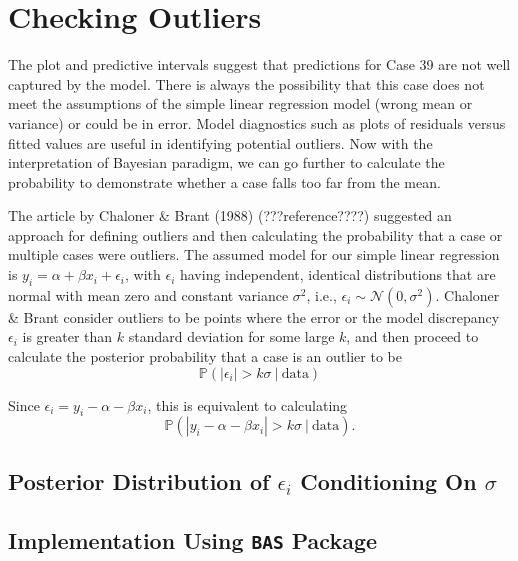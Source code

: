 \documentclass[]{book}
\theoremstyle{definition}
\theoremstyle{definition}
\theoremstyle{definition}
\theoremstyle{remark}
\begin{document}
\section{Checking Outliers}\label{checking-outliers}

The plot and predictive intervals suggest that predictions for Case 39
are not well captured by the model. There is always the possibility that
this case does not meet the assumptions of the simple linear regression
model (wrong mean or variance) or could be in error. Model diagnostics
such as plots of residuals versus fitted values are useful in
identifying potential outliers. Now with the interpretation of Bayesian
paradigm, we can go further to calculate the probability to demonstrate
whether a case falls too far from the mean.

The article by Chaloner \& Brant (1988) (???reference????) suggested an
approach for defining outliers and then calculating the probability that
a case or multiple cases were outliers. The assumed model for our simple
linear regression is \(y_i=\alpha + \beta x_i+\epsilon_i\), with
\(\epsilon_i\) having independent, identical distributions that are
normal with mean zero and constant variance \(\sigma^2\), i.e.,
\(\epsilon_i \sim \mathcal{N}(0, \sigma^2)\). Chaloner \& Brant consider
outliers to be points where the error or the model discrepancy
\(\epsilon_i\) is greater than \(k\) standard deviation for some large
\(k\), and then proceed to calculate the posterior probability that a
case is an outlier to be
\[ \mathbb{P}(|\epsilon_i| > k\sigma ~|~\text{data}) \]

Since \(\epsilon_i = y_i - \alpha-\beta x_i\), this is equivalent to
calculating
\[ \mathbb{P}(|y_i-\alpha-\beta x_i| > k\sigma~|~\text{data}).\]

\subsection{\texorpdfstring{Posterior Distribution of \(\epsilon_i\)
Conditioning On
\(\sigma\)}{Posterior Distribution of \textbackslash{}epsilon\_i Conditioning On \textbackslash{}sigma}}\label{posterior-distribution-of-epsilonux5fi-conditioning-on-sigma}

\subsection{\texorpdfstring{Implementation Using \texttt{BAS}
Package}{Implementation Using BAS Package}}\label{implementation-using-bas-package}
\end{document}
